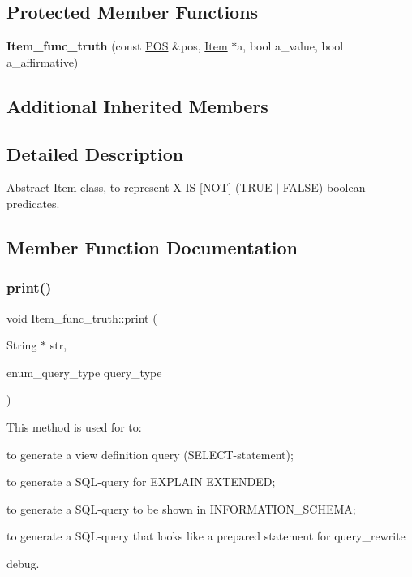 \subsection*{Protected Member Functions}
\begin{DoxyCompactItemize}
\item 
\mbox{\label{classItem__func__truth_aca8fb3ebe1a9d39a40e85ebb0258b36d}} 
{\bfseries Item\+\_\+func\+\_\+truth} (const \mbox{\hyperlink{structYYLTYPE}{P\+OS}} \&pos, \mbox{\hyperlink{classItem}{Item}} $\ast$a, bool a\+\_\+value, bool a\+\_\+affirmative)
\end{DoxyCompactItemize}
\subsection*{Additional Inherited Members}


\subsection{Detailed Description}
Abstract \mbox{\hyperlink{classItem}{Item}} class, to represent {\ttfamily X IS \mbox{[}N\+OT\mbox{]} (T\+R\+UE $\vert$ F\+A\+L\+SE)} boolean predicates. 

\subsection{Member Function Documentation}
\mbox{\label{classItem__func__truth_aa17f138c8366c33e377d3e64384415c1}} 
\subsubsection{\texorpdfstring{print()}{print()}}
{\footnotesize\ttfamily void Item\+\_\+func\+\_\+truth\+::print (\begin{DoxyParamCaption}\item[{String $\ast$}]{str,  }\item[{enum\+\_\+query\+\_\+type}]{query\+\_\+type }\end{DoxyParamCaption})\hspace{0.3cm}{\ttfamily [virtual]}}

This method is used for to\+:
\begin{DoxyItemize}
\item to generate a view definition query (S\+E\+L\+E\+CT-\/statement);
\item to generate a S\+QL-\/query for E\+X\+P\+L\+A\+IN E\+X\+T\+E\+N\+D\+ED;
\item to generate a S\+QL-\/query to be shown in I\+N\+F\+O\+R\+M\+A\+T\+I\+O\+N\+\_\+\+S\+C\+H\+E\+MA;
\item to generate a S\+QL-\/query that looks like a prepared statement for query\+\_\+rewrite
\item debug.
\end{DoxyItemize}

